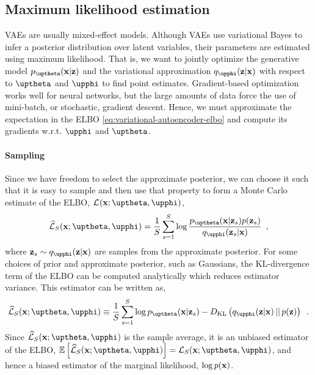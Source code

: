 

\subsection{Maximum likelihood estimation}
%
VAEs are usually mixed-effect models. Although VAEs use variational Bayes to infer a posterior distribution over latent variables, their parameters are estimated using maximum likelihood. 
That is, we want to jointly optimize the generative model $p_\thetab(\xb|\zb)$ and the variational approximation $q_\phib(\zb|\xb)$ with respect to $\thetab$ and $\phib$ to find point estimates. 
Gradient-based optimization works well for neural networks, but the large amounts of data force the use of mini-batch, or stochastic, gradient descent. 
Hence, we must approximate the expectation in the ELBO \cref{eq:variational-autoencoder-elbo} and compute its gradients w.r.t. $\phib$ and $\thetab$. 

\paragraph{Sampling}
Since we have freedom to select the approximate posterior, we can choose it such that it is easy to sample and then use that property to form a Monte Carlo estimate of the ELBO, $\mathcal{L}_{}(\xb;\thetab,\phib)$,
% 
\begin{equation} \label{eq:variational-autoencoder-elbo-sampling-expanded}
    \widehat{\mathcal{L}}_{S}(\xb;\thetab,\phib)
    =
    \frac{1}{S} \sum_{s=1}^{S} \log \frac{p_\thetab(\xb|\zb_{s}) p(\zb_{s})}{q_\phib(\zb_{s}|\xb)} \enspace , 
\end{equation}
%
where $\zb_{s} \sim q_\phib(\zb|\xb)$ are samples from the approximate posterior. 
For some choices of prior and approximate posterior, such as Gaussians, the KL-divergence term of the ELBO can be computed analytically which reduces estimator variance. 
This estimator can be written as,
%
\begin{equation} \label{eq:variational-autoencoder-elbo-sampling-KL}
    \widehat{\mathcal{L}}_{S}(\xb;\thetab,\phib)
    \equiv
    \frac{1}{S} \sum_{s=1}^{S} \log p_\thetab(\xb|\zb_{s}) - D_\text{KL}\left( q_\phib(\zb|\xb) \,||\, p(\zb) \right)\enspace .
\end{equation}
%
Since $\widehat{\mathcal{L}}_{S}(\xb;\thetab,\phib)$ is the sample average, it is an unbiased estimator of the ELBO, $\mathbb{E}\left[\widehat{\mathcal{L}}_{S}(\xb;\thetab,\phib)\right] = \mathcal{L}_{S}(\xb;\thetab,\phib)$, and hence a biased estimator of the marginal likelihood, $\log p({\mathbf{x}})$.


